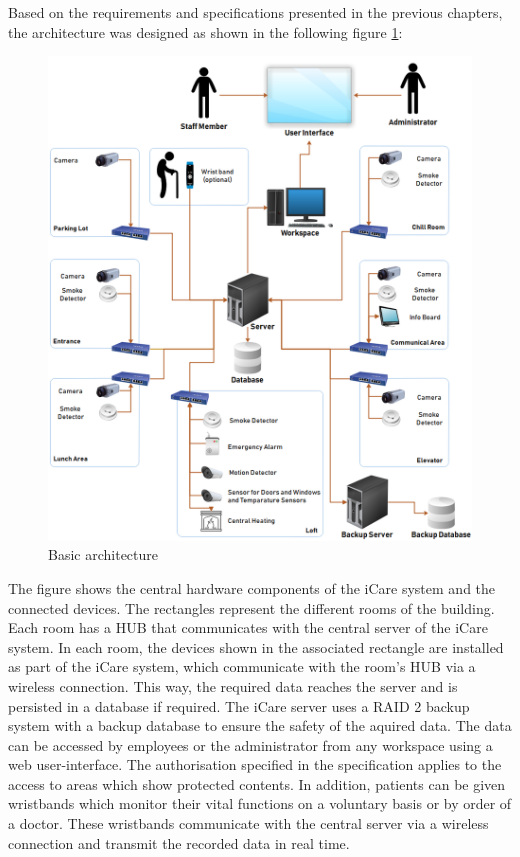 Based on the requirements and specifications presented in the previous chapters, the architecture was designed as shown in the following figure \ref{architecure}:
\begin{figure}[H]
	\centering
	\includegraphics[width =1.0\textwidth]{images/architecture.PNG}
	\caption{Basic architecture}
	\label{architecure}
\end{figure}
The figure shows the central hardware components of the iCare system and the connected devices. The rectangles represent the different rooms of the building. Each room has a HUB that communicates with the central server of the iCare system. In each room, the devices shown in the associated rectangle are installed as part of the iCare system, which communicate with the room's HUB via a wireless connection. This way, the required data reaches the server and is persisted in a database if required. The iCare server uses a RAID 2 backup system with a backup database to ensure the safety of the aquired data. The data can be accessed by employees or the administrator from any workspace using a web user-interface. The authorisation specified in the specification applies to the access to areas which show protected contents. In addition, patients can be given wristbands which monitor their vital functions on a voluntary basis or by order of a doctor. These wristbands communicate with the central server via a wireless connection and transmit the recorded data in real time.